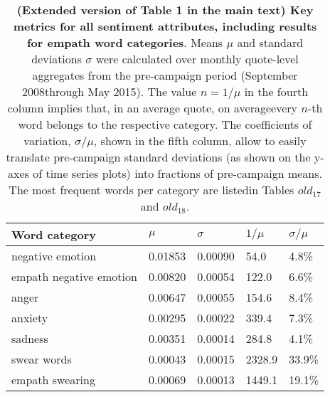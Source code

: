 \begin{table}[h]\centering
\caption{\textbf{(Extended version of Table 1 in the main text) Key metrics for all sentiment attributes, including results for empath word categories}. Means $\mu$ and standard deviations $\sigma$ were calculated over monthly quote-level aggregates from the pre-campaign period (September 2008through May 2015). The value $n=1/\mu$ in the fourth column implies that, in an average quote, on averageevery $n$-th word belongs to the respective category. The coefficients of variation, $\sigma/\mu$, shown in the fifth column, allow to easily translate pre-campaign standard deviations (as shown on the y-axes of time series plots) into fractions of pre-campaign means. The most frequent words per category are listedin Tables $old_17$ and $old_18$.}
	\label{fig: mean_std}
	\begin{tabular}{lllll}
	\toprule
	Word category &    $\mu$ & $\sigma$ & $1/\mu$ & $\sigma / \mu$ \\
	\midrule
	negative emotion        &  0.01853 &  0.00090 &    54.0 &          4.8\% \\
	empath negative emotion &  0.00820 &  0.00054 &   122.0 &          6.6\% \\
	anger                   &  0.00647 &  0.00055 &   154.6 &          8.4\% \\
	anxiety                 &  0.00295 &  0.00022 &   339.4 &          7.3\% \\
	sadness                 &  0.00351 &  0.00014 &   284.8 &          4.1\% \\
	swear words             &  0.00043 &  0.00015 &  2328.9 &         33.9\% \\
	empath swearing         &  0.00069 &  0.00013 &  1449.1 &         19.1\% \\
	\bottomrule
	\end{tabular}
	
\end{table}

